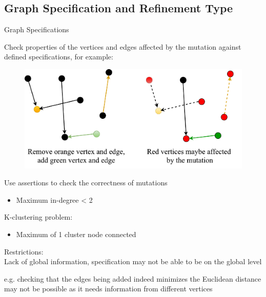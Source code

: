 \subsection{Graph Specification and Refinement Type}
\begin{frame}{Graph Specifications}

Check properties of the vertices and edges affected by the mutation against
defined specifications, for example:

\begin{figure}
\includegraphics[width=0.7\linewidth]{figures/fig-specification1.pdf}
\end{figure}

Use assertions to check the correctness of mutations

\begin{itemize}
  \item Maximum in-degree < 2
\end{itemize}

\end{frame}


\begin{frame}
K-clustering problem:
\begin{itemize}
  \item Maximum of 1 cluster node connected
\end{itemize}

Restrictions:\\
  Lack of global information, specification may not be able to be on the
  global level

  e.g. checking that the edges being added indeed minimizes the Euclidean
  distance may not be possible as it needs information from different vertices
\end{frame}

